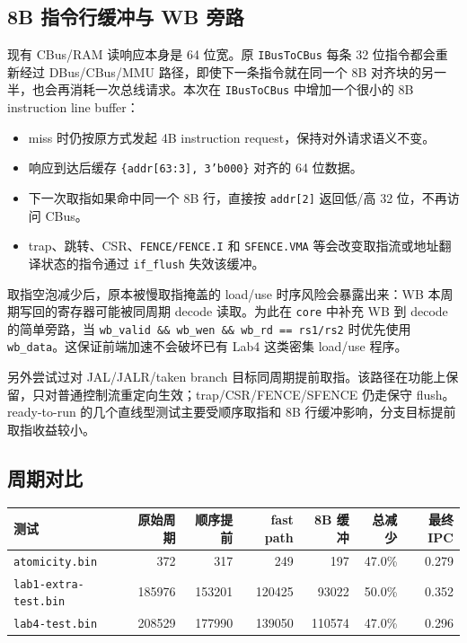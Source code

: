 \documentclass[UTF8,a4paper,11pt]{ctexart}
\begin{document}
\subsection{8B 指令行缓冲与 WB 旁路}

现有 CBus/RAM 读响应本身是 64 位宽。原 \texttt{IBusToCBus} 每条 32 位指令都会重新经过 DBus/CBus/MMU 路径，即使下一条指令就在同一个 8B 对齐块的另一半，也会再消耗一次总线请求。本次在 \texttt{IBusToCBus} 中增加一个很小的 8B instruction line buffer：

\begin{itemize}
  \item miss 时仍按原方式发起 4B instruction request，保持对外请求语义不变。
  \item 响应到达后缓存 \texttt{\{addr[63:3], 3'b000\}} 对齐的 64 位数据。
  \item 下一次取指如果命中同一个 8B 行，直接按 \texttt{addr[2]} 返回低/高 32 位，不再访问 CBus。
  \item trap、跳转、CSR、\texttt{FENCE/FENCE.I} 和 \texttt{SFENCE.VMA} 等会改变取指流或地址翻译状态的指令通过 \texttt{if\_flush} 失效该缓冲。
\end{itemize}

取指空泡减少后，原本被慢取指掩盖的 load/use 时序风险会暴露出来：WB 本周期写回的寄存器可能被同周期 decode 读取。为此在 \texttt{core} 中补充 WB 到 decode 的简单旁路，当 \texttt{wb\_valid \&\& wb\_wen \&\& wb\_rd == rs1/rs2} 时优先使用 \texttt{wb\_data}。这保证前端加速不会破坏已有 Lab4 这类密集 load/use 程序。

另外尝试过对 JAL/JALR/taken branch 目标同周期提前取指。该路径在功能上保留，只对普通控制流重定向生效；trap/CSR/FENCE/SFENCE 仍走保守 flush。ready-to-run 的几个直线型测试主要受顺序取指和 8B 行缓冲影响，分支目标提前取指收益较小。

\subsection{周期对比}

\begin{center}
\begin{tabular}{lrrrrrr}
\toprule
测试 & 原始周期 & 顺序提前 & fast path & 8B 缓冲 & 总减少 & 最终 IPC \\
\midrule
\texttt{atomicity.bin} & 372 & 317 & 249 & 197 & 47.0\% & 0.279 \\
\texttt{lab1-extra-test.bin} & 185976 & 153201 & 120425 & 93022 & 50.0\% & 0.352 \\
\texttt{lab4-test.bin} & 208529 & 177990 & 139050 & 110574 & 47.0\% & 0.296 \\
\bottomrule
\end{tabular}
\end{center}
\end{document}
